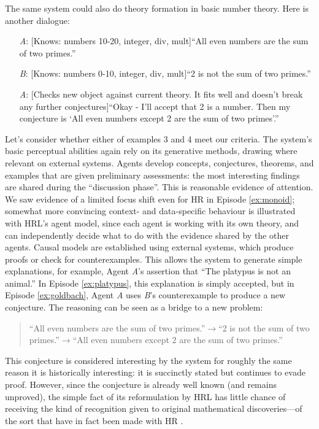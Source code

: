 \begin{ep}\label{ex:goldbach}
The same system could also do theory formation in basic number theory.
Here is another dialogue:
\begin{itemize}
\item[\emph{A}:] {[}Knows: numbers 10-20, integer, div, mult{]}\newline ``All even numbers are the sum of two primes.''
\item[\emph{B}:] {[}Knows: numbers 0-10, integer, div, mult{]}\newline ``2 is not the sum of two primes.''
\item[\emph{A}:] {[}Checks new object against current theory. It fits well and doesn't break any further conjectures{]}\newline ``Okay - I'll accept that 2 is a number. Then my conjecture is `All even numbers except 2 are the sum of two primes'.''
\end{itemize}
\end{ep}

Let's consider whether either of examples 3 and 4 meet our criteria.
The system's basic perceptual abilities again rely on its generative
methods, drawing where relevant on external systems.  Agents develop
concepts, conjectures, theorems, and examples that are given
preliminary assessments: the most interesting findings are shared
during the ``discussion phase''.  This is reasonable evidence of
attention.  We saw evidence of a limited focus shift even for {\sf HR}
in Episode \ref{ex:monoid}; somewhat more convincing context- and
data-specific behaviour is illustrated with {\sf HRL}'s agent model,
since each agent is working with its own theory, and can independently
decide what to do with the evidence shared by the other agents.
Causal models are established using external systems, which produce
proofs or check for counterexamples.  This allows the system to
generate simple explanations, for example, Agent \emph{A}'s assertion
that ``The platypus is not an animal.''
In Episode \ref{ex:platypus}, this explanation is simply accepted, but
in Episode \ref{ex:goldbach}, Agent \emph{A} uses \emph{B}'s
counterexample to produce a new conjecture.  The reasoning can be seen
as a bridge to a new problem:
\begin{quote}
``All even numbers are the sum of
two primes.''\:$\rightarrow$\:``2 is not the sum of two
primes.''\:$\rightarrow$\:``All even numbers except 2 are the sum of two
primes.'' 
\end{quote}
This conjecture is considered interesting by the system for roughly
the same reason it is historically interesting: it is succinctly
stated but continues to evade proof.  However, since the conjecture
is already well known (and remains unproved), the simple
fact of its reformulation by {\sf HRL} has little chance of 
receiving the kind of recognition given to original mathematical
discoveries---of the sort that have in fact been made with {\sf HR}
\cite{colton2007computational}.

